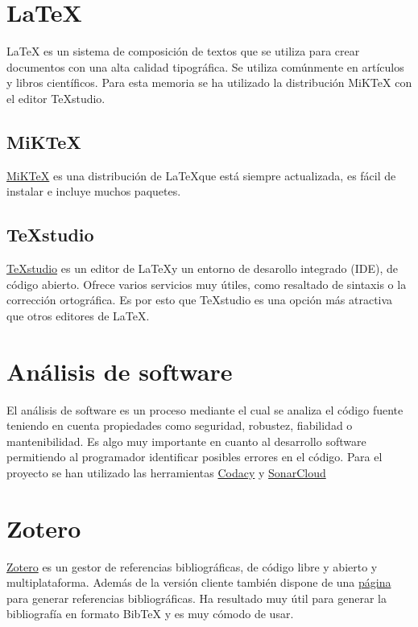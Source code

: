 \section{\LaTeX}

\LaTeX\cite{LaTeX2020} es un sistema de composición de textos que se utiliza para crear documentos con una alta calidad tipográfica. Se utiliza comúnmente en artículos y libros científicos. Para esta memoria se ha utilizado la distribución MiKTeX con el editor TeXstudio.

\subsection{MiKTeX}

\href{https://miktex.org/}{MiKTeX} es una distribución de \LaTeX que está siempre actualizada, es fácil de instalar e incluye muchos paquetes.

\subsection{TeXstudio}

\href{https://www.texstudio.org/}{TeXstudio}\cite{TeXstudio2019} es un editor de \LaTeX y un entorno de desarollo integrado (IDE), de código abierto. Ofrece varios servicios muy útiles, como resaltado de sintaxis o la corrección ortográfica. Es por esto que TeXstudio es una opción más atractiva que otros editores de \LaTeX.

\section{Análisis de software}

El análisis de software\cite{AnalisisSoftware2019} es un proceso mediante el cual se analiza el código fuente teniendo en cuenta propiedades como seguridad, robustez, fiabilidad o mantenibilidad. Es algo muy importante en cuanto al desarrollo software permitiendo al programador identificar posibles errores en el código. Para el proyecto se han utilizado las herramientas \href{https://app.codacy.com/}{Codacy} y \href{https://sonarcloud.io/}{SonarCloud}


\section{Zotero}

\href{https://www.zotero.org/}{Zotero}\cite{Zotero2020} es un gestor de referencias bibliográficas, de código libre y abierto y multiplataforma. Además de la versión cliente también dispone de una \href{https://zbib.org/}{página} para generar referencias bibliográficas. Ha resultado muy útil para generar la bibliografía en formato BibTeX y es muy cómodo de usar.

